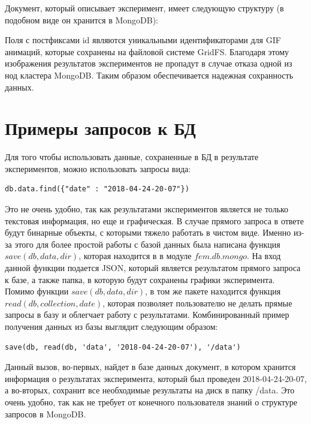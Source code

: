 \documentclass[14pt]{extreport}
\begin{document}
Документ, который описывает эксперимент, имеет следующую структуру (в подобном виде он хранится в MongoDB):

\begin{minipage}{\linewidth}

\end{minipage}

Поля с постфиксами id являются уникальными идентификаторами для GIF анимаций, которые сохранены на файловой системе GridFS. Благодаря этому изображения результатов экспериментов не пропадут в случае отказа одной из нод кластера MongoDB. Таким образом обеспечивается надежная сохранность данных.

\section{Примеры запросов к БД}
Для того чтобы использовать данные, сохраненные в БД в результате экспериментов, можно использовать запросы вида:

\begin{lstlisting}
db.data.find({"date" : "2018-04-24-20-07"})
\end{lstlisting}

Это не очень удобно, так как результатами экспериментов является не только текстовая информация, но еще и графическая. В случае прямого запроса в ответе будут бинарные объекты, с которыми тяжело работать в чистом виде. Именно из-за этого для более простой работы с базой данных была написана функция $save(db, data, dir)$, которая находится в в модуле $fem.db.mongo$. На вход данной функции подается JSON, который является результатом прямого запроса к базе, а также папка, в которую будут сохранены графики эксперимента. Помимо функции $save(db, data, dir)$, в том же пакете находится функция $read(db, collection, date)$, которая позволяет пользователю не делать прямые запросы в базу и облегчает работу с результатами. Комбинированный пример получения данных из базы выглядит следующим образом:

\begin{lstlisting}
save(db, read(db, 'data', '2018-04-24-20-07'), '/data')
\end{lstlisting}

Данный вызов, во-первых, найдет в базе данных документ, в котором хранится информация о результатах эксперимента, который был проведен 2018-04-24-20-07, а во-вторых, сохранит все необходимые результаты на диск в папку /data. Это очень удобно, так как не требует от конечного пользователя знаний о структуре запросов в MongoDB. 
\end{document}
